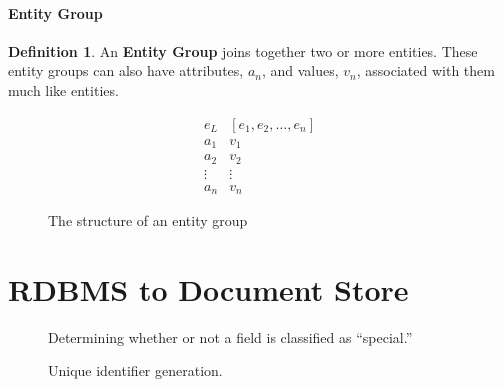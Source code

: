 \documentclass[12pt,letterpaper,oneside,notitlepage]{report}
\theoremstyle{definition}
\newtheorem{defn}{Definition}
\begin{document}
				\subsubsection{Entity Group}
					\begin{defn}
						An \textbf{Entity Group} joins together two or more entities.  These entity groups can also have attributes, $a_n$, and values, $v_n$, associated with them much like entities.

						\begin{figure}[!ht]
							\centering
							\[
								\begin{array}{ll}
									e_L & \left[ e_1, e_2, \ldots, e_n \right] \\
									a_1 & v_1 \\
									a_2 & v_2 \\
									\vdots & \vdots \\
									a_n & v_n
								\end{array}
							\]
							\caption{The structure of an entity group}
							\label{fig:entity-group-rep}
						\end{figure}

%
%							
%
					\end{defn}

	\chapter{RDBMS to Document Store}
		\begin{figure}[ht!]
			\caption{Determining whether or not a field is classified as ``special.''}
			\label{src:molly-datatypes-entity-special}
		\end{figure}
		
		\begin{figure}[ht!]
			\caption{Unique identifier generation.}
			\label{src:molly-datatypes-entity-uid}
		\end{figure}
		
\end{document}
